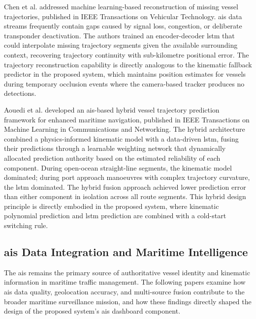 Chen et al. \cite{Chen2025} addressed machine learning-based reconstruction of
missing vessel trajectories, published in IEEE Transactions on Vehicular Technology.
\gls{ais} data streams frequently contain gaps caused by signal loss, congestion, or
deliberate transponder deactivation. The authors trained an encoder-decoder \gls{lstm}
that could interpolate missing trajectory segments given the available surrounding
context, recovering trajectory continuity with sub-kilometre positional error.
The trajectory reconstruction capability is directly analogous to the kinematic
fallback predictor in the proposed system, which maintains position estimates for
vessels during temporary occlusion events where the camera-based tracker produces
no detections.
 
Aouedi et al. \cite{Aouedi2026} developed an \gls{ais}-based hybrid vessel trajectory
prediction framework for enhanced maritime navigation, published in IEEE Transactions
on Machine Learning in Communications and Networking. The hybrid architecture combined
a physics-informed kinematic model with a data-driven \gls{lstm}, fusing their predictions
through a learnable weighting network that dynamically allocated prediction authority
based on the estimated reliability of each component. During open-ocean straight-line
segments, the kinematic model dominated; during port approach manoeuvres with complex
trajectory curvature, the \gls{lstm} dominated. The hybrid fusion approach achieved lower
prediction error than either component in isolation across all route segments. This
hybrid design principle is directly embodied in the proposed system, where kinematic
polynomial prediction and \gls{lstm} prediction are combined with a cold-start switching
rule.
 
\subsection{\texorpdfstring{\gls{ais}}{AIS} Data Integration and Maritime Intelligence}
The \gls{ais} remains the primary source of authoritative
vessel identity and kinematic information in maritime traffic management. The
following papers examine how \gls{ais} data quality, geolocation accuracy, and
multi-source fusion contribute to the broader maritime surveillance mission,
and how these findings directly shaped the design of the proposed system's
\gls{ais} dashboard component.
 
